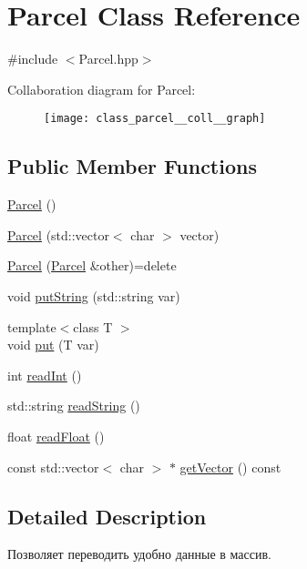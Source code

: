 \hypertarget{class_parcel}{\section{Parcel Class Reference}
\label{class_parcel}
}


{\ttfamily \#include $<$Parcel.\-hpp$>$}



Collaboration diagram for Parcel\-:
\nopagebreak
\begin{figure}[H]
\begin{center}
\leavevmode
\texttt{[image: class\_parcel\_\_coll\_\_graph]}
\end{center}
\end{figure}
\subsection*{Public Member Functions}
\begin{DoxyCompactItemize}
\item 
\hyperlink{class_parcel_a80bc44e52660817288138bc3e8eeb913}{Parcel} ()
\item 
\hyperlink{class_parcel_af4041109946826da335989a6554153e0}{Parcel} (std\-::vector$<$ char $>$ vector)
\item 
\hyperlink{class_parcel_a75b0f276e47657edb2cc4f51d571158e}{Parcel} (\hyperlink{class_parcel}{Parcel} \&other)=delete
\item 
void \hyperlink{class_parcel_a0b164ec23965e3f37dd8a0d99321e232}{put\-String} (std\-::string var)
\item 
{\footnotesize template$<$class T $>$ }\\void \hyperlink{class_parcel_a19b5c8e0abaec80ea10da49d0832ad5b}{put} (T var)
\item 
int \hyperlink{class_parcel_a4540d13bf8699f6f3bcafd9e95bce706}{read\-Int} ()
\item 
std\-::string \hyperlink{class_parcel_ad0d3b72bb1ca2319bab9a1981f60cd53}{read\-String} ()
\item 
float \hyperlink{class_parcel_aea33f46c6e77dd0c297e1ef5fdf5973e}{read\-Float} ()
\item 
const std\-::vector$<$ char $>$ $\ast$ \hyperlink{class_parcel_ad76fa40dc5cf6ede93b627f3f4845176}{get\-Vector} () const 
\end{DoxyCompactItemize}


\subsection{Detailed Description}
Позволяет переводить удобно данные в массив. 


